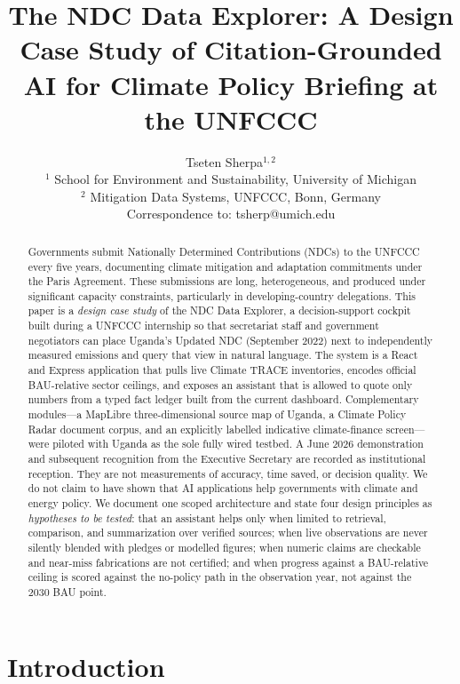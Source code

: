 \documentclass{article}
\title{The NDC Data Explorer: A Design Case Study of Citation-Grounded AI for Climate Policy Briefing at the UNFCCC}
\author{%
  Tseten Sherpa$^{1,2}$ \\
  $^{1}$ School for Environment and Sustainability, University of Michigan \\
  $^{2}$ Mitigation Data Systems, UNFCCC, Bonn, Germany \\
  Correspondence to: tsherp@umich.edu
}
\begin{document}
\maketitle

\begin{abstract}
Governments submit Nationally Determined Contributions (NDCs) to the UNFCCC every five years, documenting climate mitigation and adaptation commitments under the Paris Agreement. These submissions are long, heterogeneous, and produced under significant capacity constraints, particularly in developing-country delegations. This paper is a \emph{design case study} of the NDC Data Explorer, a decision-support cockpit built during a UNFCCC internship so that secretariat staff and government negotiators can place Uganda's Updated NDC (September 2022) next to independently measured emissions and query that view in natural language. The system is a React and Express application that pulls live Climate TRACE inventories, encodes official BAU-relative sector ceilings, and exposes an assistant that is allowed to quote only numbers from a typed fact ledger built from the current dashboard. Complementary modules---a MapLibre three-dimensional source map of Uganda, a Climate Policy Radar document corpus, and an explicitly labelled indicative climate-finance screen---were piloted with Uganda as the sole fully wired testbed. A June 2026 demonstration and subsequent recognition from the Executive Secretary are recorded as institutional reception. They are not measurements of accuracy, time saved, or decision quality. We do not claim to have shown that AI applications help governments with climate and energy policy. We document one scoped architecture and state four design principles as \emph{hypotheses to be tested}: that an assistant helps only when limited to retrieval, comparison, and summarization over verified sources; when live observations are never silently blended with pledges or modelled figures; when numeric claims are checkable and near-miss fabrications are not certified; and when progress against a BAU-relative ceiling is scored against the no-policy path in the observation year, not against the 2030 BAU point.
\end{abstract}

\section{Introduction}
\label{sec:intro}
\end{document}
